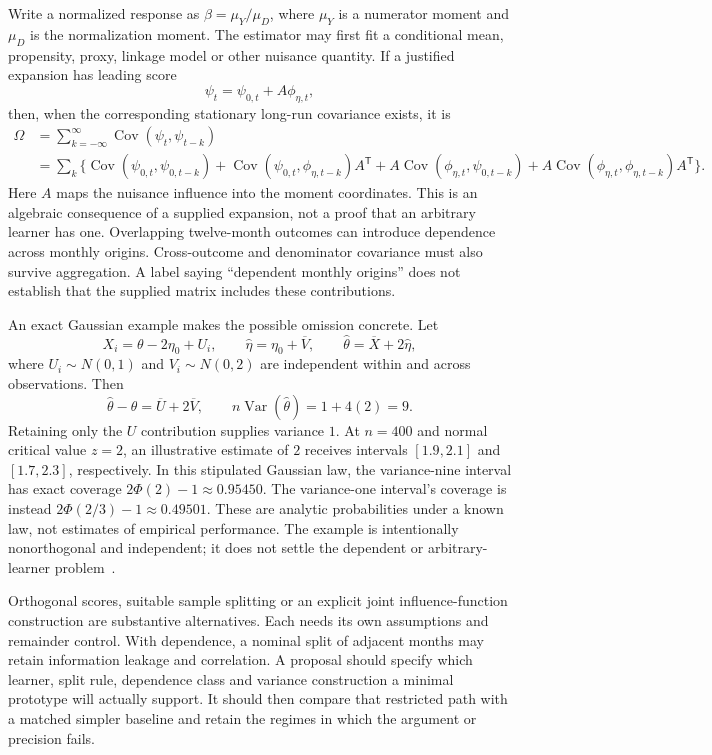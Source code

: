 Write a normalized response as $\beta=\mu_Y/\mu_D$, where $\mu_Y$ is a
numerator moment and $\mu_D$ is the normalization moment. The estimator may
first fit a conditional mean, propensity, proxy, linkage model or other
nuisance quantity. If a justified expansion has leading score
\[
 \psi_t=\psi_{0,t}+A\phi_{\eta,t},
\]
then, when the corresponding stationary long-run covariance exists, it is
\begin{align*}
 \Omega
 &=\sum_{k=-\infty}^{\infty}
   \operatorname{Cov}(\psi_t,\psi_{t-k})\\
 &=\sum_k\bigl\{
   \operatorname{Cov}(\psi_{0,t},\psi_{0,t-k})
   +\operatorname{Cov}(\psi_{0,t},\phi_{\eta,t-k})A^{\mathsf T}
   +A\operatorname{Cov}(\phi_{\eta,t},\psi_{0,t-k})
   +A\operatorname{Cov}(\phi_{\eta,t},\phi_{\eta,t-k})A^{\mathsf T}
   \bigr\}.
\end{align*}
Here $A$ maps the nuisance influence into the moment coordinates. This is an
algebraic consequence of a supplied expansion, not a proof that an arbitrary
learner has one. Overlapping twelve-month outcomes can introduce dependence
across monthly origins. Cross-outcome and denominator covariance must also
survive aggregation. A label saying ``dependent monthly origins'' does not
establish that the supplied matrix includes these contributions.

An exact Gaussian example makes the possible omission concrete. Let
\[
 X_i=\theta-2\eta_0+U_i,\qquad
 \widehat\eta=\eta_0+\overline V,\qquad
 \widehat\theta=\overline X+2\widehat\eta,
\]
where $U_i\sim N(0,1)$ and $V_i\sim N(0,2)$ are independent within and
across observations. Then
\[
 \widehat\theta-\theta=\overline U+2\overline V,
 \qquad n\operatorname{Var}(\widehat\theta)=1+4(2)=9.
\]
Retaining only the $U$ contribution supplies variance $1$. At $n=400$ and
normal critical value $z=2$, an illustrative estimate of $2$ receives intervals
$[1.9,2.1]$ and $[1.7,2.3]$, respectively. In this stipulated Gaussian law,
the variance-nine interval has exact coverage $2\Phi(2)-1\approx0.95450$.
The variance-one interval's coverage is instead
$2\Phi(2/3)-1\approx0.49501$. These are analytic probabilities under a known
law, not estimates of empirical performance. The example is intentionally
nonorthogonal and independent; it does not settle the dependent or
arbitrary-learner problem~\citep{exec13_funding_exact}.

Orthogonal scores, suitable sample splitting or an explicit joint
influence-function construction are substantive alternatives. Each needs
its own assumptions and remainder control. With dependence, a nominal
split of adjacent months may retain information leakage and correlation.
A proposal should specify which learner, split rule, dependence class and
variance construction a minimal prototype will actually support. It should
then compare that restricted path with a matched simpler baseline and retain
the regimes in which the argument or precision fails.

